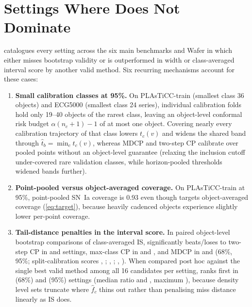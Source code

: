 \FloatBarrier
\section{Settings Where \gamut{} Does Not Dominate}
\label{app:unfavourable}
 catalogues every setting across the six main benchmarks and Wafer in which \gamut{} either misses bootstrap validity or is outperformed in width or class-averaged interval score by another valid method.
Six recurring mechanisms account for these cases:
\begin{enumerate}
\item \textbf{Small calibration classes at 95\%.}
On PLAsTiCC-train (smallest class 36 objects) and ECG5000 (smallest class 24 series), individual calibration folds hold only 19--40 objects of the rarest class, leaving an object-level conformal risk budget $\alpha(n_c+1)-1$ of at most one object.
Covering nearly every calibration trajectory of that class lowers $t_c(v)$ and widens the shared band through $\hat t_b=\min_c t_c(v)$, whereas MDCP and two-step CP calibrate over pooled points without an object-level guarantee (relaxing the inclusion cutoff under-covered rare validation classes, while horizon-pooled thresholds widened bands further).
\item \textbf{Point-pooled versus object-averaged coverage.}
On PLAsTiCC-train at 95\%, point-pooled SN~Ia coverage is 0.93 even though \gamut{} targets object-averaged coverage (\cref{eq:target}), because heavily cadenced objects experience slightly lower per-point coverage.
\item \textbf{Tail-distance penalties in the interval score.}
In paired object-level bootstrap comparisons of class-averaged IS, \gamut{} significantly beats/loses to two-step CP in \ISVsTwoStepGamutSixtyeight{} and \ISVsTwoStepGamutNinetyfive{} settings, max-class CP in \ISVsMaxClassGamutSixtyeight{} and \ISVsMaxClassGamutNinetyfive{}, and MDCP in \ISVsMDGamutSixtyeight{} and \ISVsMDGamutNinetyfive{} (68\%, 95\%; split-calibration \gamut{} scores \ISVsTwoStepCertSixtyeight{}, \ISVsTwoStepCertNinetyfive{}; \ISVsMaxClassCertSixtyeight{}, \ISVsMaxClassCertNinetyfive{}; \ISVsMDCertSixtyeight{}, \ISVsMDCertNinetyfive{}).
When compared post hoc against the single best valid method among all 16 candidates per setting, \gamut{} ranks first in \ISWinsGamutSixtyeight{} (68\%) and \ISWinsGamutNinetyfive{} (95\%) settings (median ratio \ISMedRatioSixtyeight{} and \ISMedRatioNinetyfive{}, maximum \ISMaxRatioNinetyfive{}), because density level sets truncate where $\hat f_c$ thins out rather than penalising miss distance linearly as IS does.

\end{enumerate}
